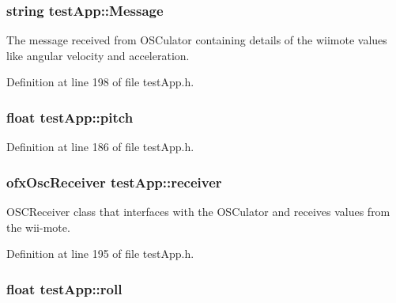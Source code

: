 \hypertarget{group___wii_mote_variables_ga0124035d0454fb6bd9152f8a87c40677}{
\subsubsection[{Message}]{\setlength{\rightskip}{0pt plus 5cm}string test\-App\-::\-Message}}\label{group___wii_mote_variables_ga0124035d0454fb6bd9152f8a87c40677}


The message received from O\-S\-Culator containing details of the wiimote values like angular velocity and acceleration. 



Definition at line 198 of file test\-App.\-h.

\hypertarget{group___wii_mote_variables_gaabbebeb113838374f659e86a0355b260}{
\subsubsection[{pitch}]{\setlength{\rightskip}{0pt plus 5cm}float test\-App\-::pitch}}\label{group___wii_mote_variables_gaabbebeb113838374f659e86a0355b260}


Definition at line 186 of file test\-App.\-h.

\hypertarget{group___wii_mote_variables_ga034c44ff60fa1e5f021e90d5410ba657}{
\subsubsection[{receiver}]{\setlength{\rightskip}{0pt plus 5cm}ofx\-Osc\-Receiver test\-App\-::receiver}}\label{group___wii_mote_variables_ga034c44ff60fa1e5f021e90d5410ba657}


O\-S\-C\-Receiver class that interfaces with the O\-S\-Culator and receives values from the wii-\/mote. 



Definition at line 195 of file test\-App.\-h.

\hypertarget{group___wii_mote_variables_ga020730abb55e6ae6d0a28edee19050e0}{
\subsubsection[{roll}]{\setlength{\rightskip}{0pt plus 5cm}float test\-App\-::roll}}\label{group___wii_mote_variables_ga020730abb55e6ae6d0a28edee19050e0}


